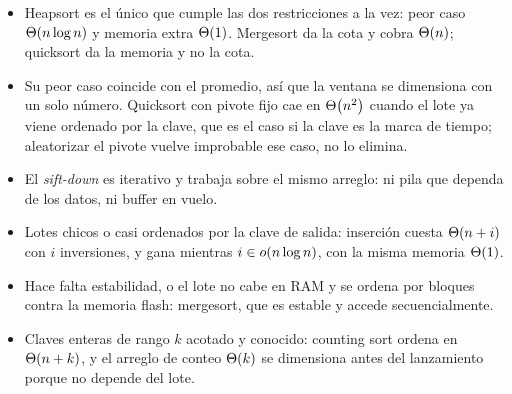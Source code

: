 \documentclass[11pt,letterpaper]{article}
\begin{document}
\begin{itemize}[nosep,leftmargin=1.2em]
  \item Heapsort es el único que cumple las dos restricciones a la
    vez: peor caso $\Theta\!\left(n\log n\right)$ y memoria extra $\Theta\!\left(1\right)$.
    Mergesort da la cota y cobra $\Theta\!\left(n\right)$; quicksort da la memoria y
    no la cota.
  \item Su peor caso coincide con el promedio, así que la ventana se
    dimensiona con un solo número. Quicksort con pivote fijo cae en
    $\Theta\!\left(n^2\right)$ cuando el lote ya viene ordenado por la clave, que es
    el caso si la clave es la marca de tiempo; aleatorizar el pivote
    vuelve improbable ese caso, no lo elimina.
  \item El \emph{sift-down} es iterativo y trabaja sobre el mismo
    arreglo: ni pila que dependa de los datos, ni buffer en vuelo.
\end{itemize}

\begin{itemize}[nosep,leftmargin=1.2em]
  \item Lotes chicos o casi ordenados por la clave de salida:
    inserción cuesta $\Theta\!\left(n + i\right)$ con $i$ inversiones, y gana
    mientras $i \in o\!\left(n\log n\right)$, con la misma memoria $\Theta\!\left(1\right)$.
  \item Hace falta estabilidad, o el lote no cabe en RAM y se ordena
    por bloques contra la memoria flash: mergesort, que es estable y
    accede secuencialmente.
  \item Claves enteras de rango $k$ acotado y conocido: counting sort
    ordena en $\Theta\!\left(n + k\right)$, y el arreglo de conteo $\Theta\!\left(k\right)$ se
    dimensiona antes del lanzamiento porque no depende del lote.
\end{itemize}

\end{document}
